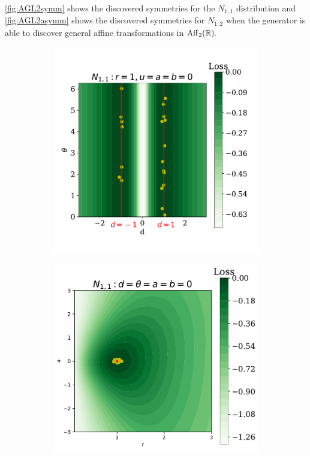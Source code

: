                 \cref{fig:AGL2symm} shows the discovered symmetries for the \(N_{1, 1}\) distribution and \cref{fig:AGL2asymm} shows the discovered symmetries for \(N_{1, 2}\) when the generator is able to discover general affine transformations in \(\operatorname{Aff}_2(\mathbb{R}).\)
\begin{figure}
    \centering
    \begin{subfigure}[b]{0.31\textwidth}
        \centering
        \includegraphics[width=\textwidth]{figures/chapter-09/6O2d-tsymm.pdf}
        \caption{}
        \label{fig:AGL2symm_i}
    \end{subfigure}
    \hfill
    \begin{subfigure}[b]{0.31\textwidth}
        \centering
        \includegraphics[width=\textwidth]{figures/chapter-09/6GL2symmRU.pdf}

\end{subfigure}
\end{figure}

